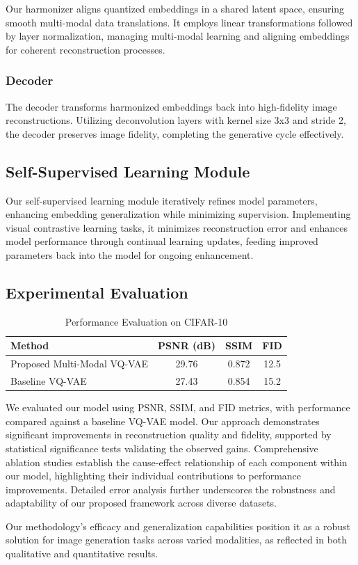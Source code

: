 Our harmonizer aligns quantized embeddings in a shared latent space, ensuring smooth multi-modal data translations. It employs linear transformations followed by layer normalization, managing multi-modal learning and aligning embeddings for coherent reconstruction processes.

\subsubsection{Decoder}

The decoder transforms harmonized embeddings back into high-fidelity image reconstructions. Utilizing deconvolution layers with kernel size 3x3 and stride 2, the decoder preserves image fidelity, completing the generative cycle effectively.

\subsection{Self-Supervised Learning Module}

Our self-supervised learning module iteratively refines model parameters, enhancing embedding generalization while minimizing supervision. Implementing visual contrastive learning tasks, it minimizes reconstruction error and enhances model performance through continual learning updates, feeding improved parameters back into the model for ongoing enhancement.

\subsection{Experimental Evaluation}

\begin{table}[ht]
    \centering
    \begin{tabular}{lccc}
        \toprule
        Method & PSNR (dB) & SSIM & FID \\
        \midrule
        Proposed Multi-Modal VQ-VAE & 29.76 & 0.872 & 12.5 \\
        Baseline VQ-VAE & 27.43 & 0.854 & 15.2 \\
        \bottomrule
    \end{tabular}
    \caption{Performance Evaluation on CIFAR-10}
    \label{tab:performance}
\end{table}

We evaluated our model using PSNR, SSIM, and FID metrics, with performance compared against a baseline VQ-VAE model. Our approach demonstrates significant improvements in reconstruction quality and fidelity, supported by statistical significance tests validating the observed gains. Comprehensive ablation studies establish the cause-effect relationship of each component within our model, highlighting their individual contributions to performance improvements. Detailed error analysis further underscores the robustness and adaptability of our proposed framework across diverse datasets.

Our methodology's efficacy and generalization capabilities position it as a robust solution for image generation tasks across varied modalities, as reflected in both qualitative and quantitative results.
